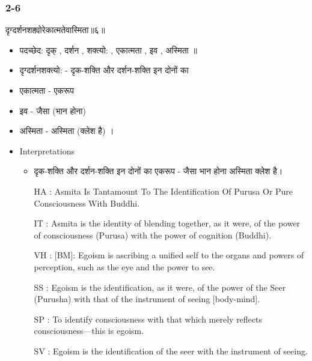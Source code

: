\begin{frame}[fragile]\frametitle{2-6}
\begin{sanskrit}
दृग्दर्शनशक्त्योरेकात्मतेवास्मिता॥६॥
\end{sanskrit}

	\begin{itemize}
	\item पदच्छेद: दृक् , दर्शन , शक्त्यो: , एकात्मता , इव , अस्मिता ॥
	\item दृग्दर्शनशक्त्यो: - दृक-शक्ति और दर्शन-शक्ति इन दोनों का
	\item एकात्मता - एकरूप
	\item इव - जैसा (भान होना)
	\item अस्मिता - अस्मिता (क्लेश है) ।	
	\item Interpretations
		\begin{itemize}
		\item दृक-शक्ति और दर्शन-शक्ति इन दोनों का एकरूप - जैसा भान होना अस्मिता क्लेश है।
		\item [HA]: Asmita Is Tantamount To The Identification Of Purusa Or Pure Consciousness With Buddhi.
		\item [IT]: Asmita is the identity of blending together, as it were, of the power of consciousness (Purusa) with the power of cognition (Buddhi).
		\item [VH]: [BM]: Egoism is ascribing a unified self to the organs and powers of perception, such as the eye and the power to see.
		\item [SS]: Egoism is the identification, as it were, of the power of the Seer (Purusha) with that of the instrument of seeing [body-mind].
		\item [SP]: To identify consciousness with that which merely reflects consciousness—this is egoism.
		\item [SV]: Egoism is the identification of the seer with the instrument of seeing. 
		\end{itemize}
	\end{itemize}
	
\end{frame}



